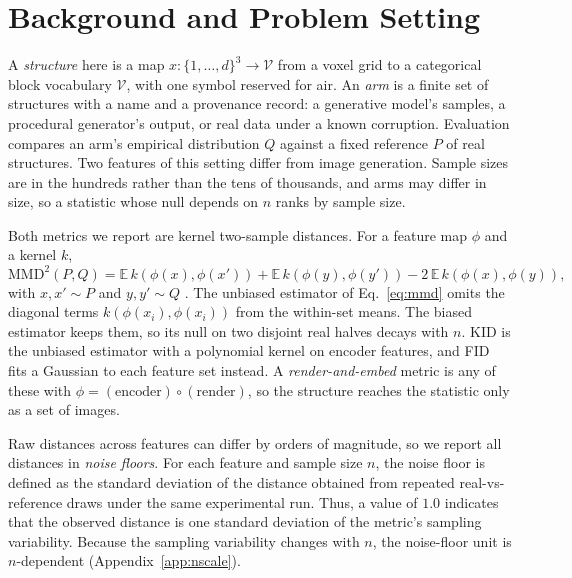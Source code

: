 \section{Background and Problem Setting}
\label{sec:background}

A \emph{structure} here is a map $x : \{1,\dots,d\}^3 \to \mathcal{V}$ from a voxel grid to a
categorical block vocabulary $\mathcal{V}$, with one symbol reserved for air. An
\emph{arm} is a finite set of structures with a name and a provenance record: a
generative model's samples, a procedural generator's output, or real data under a known
corruption. Evaluation compares an arm's empirical distribution $Q$ against a fixed
reference $P$ of real structures. Two features of this setting differ from image
generation. Sample sizes are in the hundreds rather than the tens of thousands, and arms
may differ in size, so a statistic whose null depends on $n$ ranks by sample size.

Both metrics we report are kernel two-sample distances. For a feature map $\phi$ and a
kernel $k$,
\begin{equation}
\mathrm{MMD}^2(P,Q) = \mathbb{E}\,k(\phi(x),\phi(x')) + \mathbb{E}\,k(\phi(y),\phi(y'))
  - 2\,\mathbb{E}\,k(\phi(x),\phi(y)),
\label{eq:mmd}
\end{equation}
with $x,x' \sim P$ and $y,y' \sim Q$ \citep{gretton2012mmd}. The unbiased estimator of
Eq.~\ref{eq:mmd} omits the diagonal terms $k(\phi(x_i),\phi(x_i))$ from the within-set
means. The biased estimator keeps them, so its null on two disjoint real halves decays
with $n$. KID \citep{binkowski2018kid} is the unbiased estimator with a polynomial
kernel on encoder features, and FID \citep{heusel2017fid} fits a Gaussian to each feature
set instead. A \emph{render-and-embed} metric is any of these with $\phi =
(\text{encoder}) \circ (\text{render})$, so the structure reaches the statistic only as a
set of images. 

Raw distances across features can differ by orders of magnitude, so we report all distances in \emph{noise floors}. For each feature and sample size $n$, the noise floor is defined as the standard deviation of the distance obtained from repeated real-vs-reference draws under the same experimental run. Thus, a value of $1.0$ indicates that the observed distance is one standard deviation of the metric's sampling variability. Because the sampling variability changes with $n$, the noise-floor unit is $n$-dependent (Appendix~\ref{app:nscale}). 

